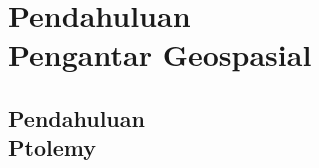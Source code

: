 \documentclass{WileySix}
\begin{document}












\part[Pendahuluan]
{Pendahuluan\\ Pengantar Geospasial}


\chapter[Sejarah Ptolemy]
{Pendahuluan\\ Ptolemy}

\end{document}
